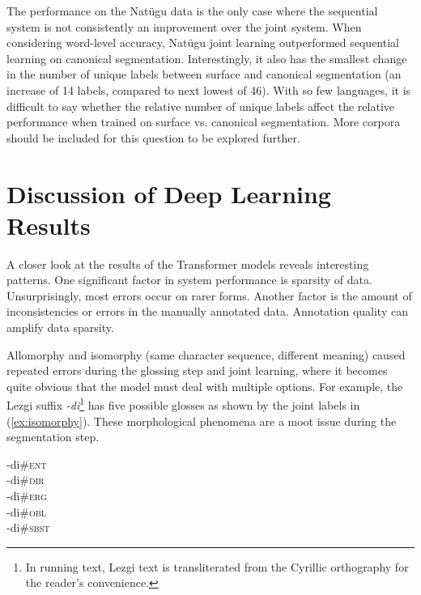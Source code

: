 The performance on the Nat\"ugu data is the only case where the sequential system is not consistently an improvement over the joint system. 
When considering word-level accuracy, Nat\"ugu joint learning outperformed sequential learning on canonical segmentation. Interestingly, it also has the smallest change in the number of unique labels between surface and canonical segmentation (an increase of 14 labels, compared to next lowest of 46). With so few languages, it is difficult to say whether the relative number of unique labels affect the relative performance when trained on surface vs. canonical segmentation. More corpora should be included for this question to be explored further. %
 

\section{Discussion of Deep Learning Results}
\label{sec:sgerrors}

A closer look at the results of the Transformer models reveals interesting patterns. One significant factor in system performance is sparsity of data. Unsurprisingly, most errors occur on rarer forms. 
Another factor is the amount of inconsistencies or errors in the manually annotated data. Annotation quality can amplify data sparsity. 

Allomorphy and isomorphy (same character sequence, different meaning) caused repeated errors during the glossing step and joint learning, where it becomes quite obvious that the model must deal with multiple options. For example, the Lezgi suffix \textit{-di}\footnote{In running text, Lezgi text is transliterated from the Cyrillic orthography for the reader's convenience.} has five possible glosses as shown by the joint labels in (\ref{ex:isomorphy}). These morphological phenomena are a moot issue during the segmentation step. 

\pex   
\label{ex:isomorphy}
-di\#\textsc{ent} \\
-di\#\textsc{dir} \\
-di\#\textsc{erg} \\
-di\#\textsc{obl} \\
-di\#\textsc{sbst} 
\xe

